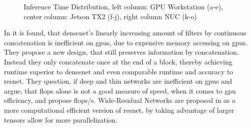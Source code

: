\begin{figure}
\begin{minipage}{.33\textwidth}
		\hfill
		\hfill
	\end{minipage}
	\caption[Platform Inference Time of \gls{dnn}s]{Inference Time Distribution, left column: GPU Workstation (a-e), center column: Jetson TX2 (f-j), right column NUC (k-o)}
	\label{fig:inference-time-dist}
\end{figure}

In \cite{lee_energy_2019} it is found, that \gls{densenet}'s linearly increasing amount of filters by continuous concatenation is inefficient on \gls{gpu}s, due to expensive memory accessing on \gls{gpu}s. They propose a new design, that still preserves information by concatenation. Instead they only concatenate once at the end of a block, thereby achieving runtime superior to \gls{densenet} and even comparable runtime and accuracy to \gls{resnet}. They question, if deep and thin networks are inefficient on \gls{gpu}s and argue, that \gls{flop}s alone is not a good measure of speed, when it comes to \gls{gpu} efficiency, and propose \gls{flop}s/s. Wide-Residual Networks are proposed in \cite{zagoruyko_wide_2017} as a more computational efficient version of \gls{resnet}, by taking advantage of larger tensors allow for more parallelization. 

